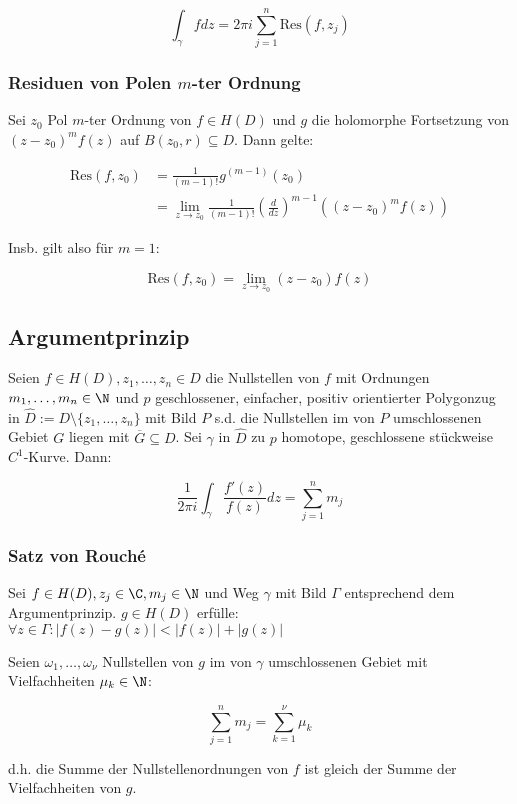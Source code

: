 \vspace*{-4mm}
\[ \int_\gamma f dz = 2\pi i \sum_{j=1}^n \text{Res}(f,z_j) \]

\subsubsection*{Residuen von Polen \(m\)-ter Ordnung}

Sei \(z_0\) Pol \(m\)-ter Ordnung von \(f \in H(D)\) und \(g\) die holomorphe Fortsetzung von \((z-z_0)^m f(z)\) auf \(B(z_0,r) \subseteq D\). Dann gelte:

\vspace*{-4mm}
\begin{align*}
\text{Res}(f,z_0) &= \frac{1}{(m-1)!} g^{(m-1)}(z_0) \\
&= \lim_{z \to z_0} \frac{1}{(m-1)!}\left(\frac{d}{dz}\right)^{m-1} ((z-z_0)^m f(z))
\end{align*}

Insb. gilt also für \(m=1\):

\vspace*{-2mm}
\[ \text{Res}(f,z_0) = \lim_{z \to z_0}(z-z_0)f(z) \]

\subsection*{Argumentprinzip}

Seien \(f \in H(D), z_1, \dots, z_n \in D\) die Nullstellen von \(f\) mit Ordnungen \(m_1, \dots, m_n \in \N\) und \(p\) geschlossener, einfacher, positiv orientierter Polygonzug in \(\hat D := D \setminus \{z_1,\dots,z_n\}\) mit Bild \(P\) s.d. die Nullstellen im von \(P\) umschlossenen Gebiet \(G\) liegen mit \(\overline G \subseteq D\). Sei \(\gamma\) in \(\hat D\) zu \(p\) homotope, geschlossene stückweise \(C^1\)-Kurve. Dann:

\[ \frac{1}{2\pi i} \int_\gamma \frac{f'(z)}{f(z)} dz = \sum_{j=1}^n m_j \]

\subsubsection*{Satz von Rouché}

Sei \(f \in H(D), z_j \in \C, m_j \in \N\) und Weg \(\gamma\) mit Bild \(\Gamma\) entsprechend dem Argumentprinzip. \(g \in H(D)\) erfülle: \(\forall z \in \Gamma : |f(z)-g(z)| < |f(z)| + |g(z)|\)

Seien \(\omega_1, \dots, \omega_\nu\) Nullstellen von \(g\) im von \(\gamma\) umschlossenen Gebiet mit Vielfachheiten \(\mu_k \in \N\):

\vspace*{-2mm}
\[ \sum_{j=1}^n m_j = \sum_{k=1}^\nu \mu_k \]

d.h. die Summe der Nullstellenordnungen von \(f\) ist gleich der Summe der Vielfachheiten von \(g\).
